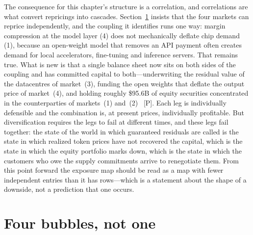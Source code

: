 The consequence for this chapter's structure is a correlation, and correlations are what convert repricings into cascades. Section~\ref{sec:four-bubbles} insists that the four markets can reprice independently, and the coupling it identifies runs one way: margin compression at the model layer (4) does not mechanically deflate chip demand (1), because an open-weight model that removes an API payment often creates demand for local accelerators, fine-tuning and inference servers. That remains true. What is new is that a single balance sheet now sits on both sides of the coupling and has committed capital to both---underwriting the residual value of the datacentres of market~(3), funding the open weights that deflate the output price of market~(4), and holding roughly \$95.6B of equity securities concentrated in the counterparties of markets~(1) and~(2)~\cite{nvda-exposure} [P]. Each leg is individually defensible and the combination is, at present prices, individually profitable. But diversification requires the legs to fail at different times, and these legs fail together: the state of the world in which guaranteed residuals are called is the state in which realized token prices have not recovered the capital, which is the state in which the equity portfolio marks down, which is the state in which the customers who owe the supply commitments arrive to renegotiate them. From this point forward the exposure map should be read as a map with fewer independent entries than it has rows---which is a statement about the shape of a downside, not a prediction that one occurs.

\section{Four bubbles, not one}
\label{sec:four-bubbles}

